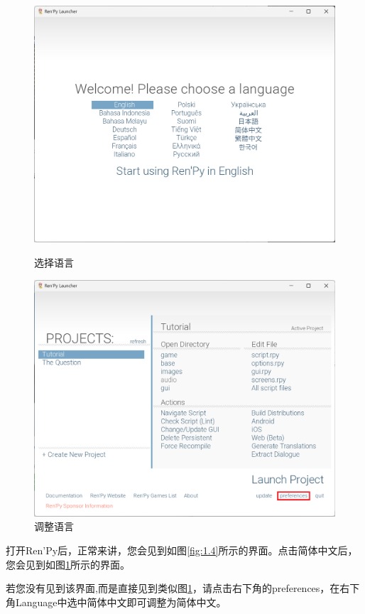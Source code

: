 \begin{figure}[htbp]
    \centering
    \begin{minipage}{182pt}
        \centering
        \includegraphics[scale=.2]{Pictures/1/1.2/1.2.4.png}
        \caption{选择语言}
        \label{fig:1.4}
    \end{minipage}
    \hspace{10pt}
    \begin{minipage}{182pt}
        \centering
        \includegraphics[scale=.2]{Pictures/1/1.2/1.2.5.png}
        \caption{调整语言}
        \label{fig:1.5}
    \end{minipage}
\end{figure}

打开Ren'Py后，正常来讲，您会见到如图\ref{fig:1.4}所示的界面。点击简体中文后，您会见到如图\ref{fig:1.5}所示的界面。

若您没有见到该界面,而是直接见到类似图\ref{fig:1.5}，请点击右下角的preferences，在右下角Language中选中简体中文即可调整为简体中文。
